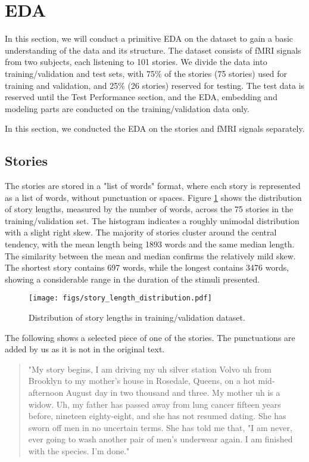 \documentclass[10pt,letterpaper]{article}
\begin{document}
\section{EDA}
In this section, we will conduct a primitive EDA on the dataset to gain a basic understanding of the data and its structure. The dataset consists of fMRI signals from two subjects, each listening to 101 stories. We divide the data into training/validation and test sets, with 75\% of the stories (75 stories) used for training and validation, and 25\% (26 stories) reserved for testing. The test data is reserved until the Test Performance section, and the EDA, embedding and modeling parts are conducted on the training/validation data only. 

In this section, we conducted the EDA on the stories and fMRI signals separately.

\subsection{Stories}
The stories are stored in a "list of words" format, where each story is represented as a list of words, without punctuation or spaces. Figure \ref{fig:story_length} shows the distribution of story lengths, measured by the number of words, across the 75 stories in the training/validation set. The histogram indicates a roughly unimodal distribution with a slight right skew. The majority of stories cluster around the central tendency, with the mean length being 1893 words and the same median length. The similarity between the mean and median confirms the relatively mild skew. The shortest story contains 697 words, while the longest contains 3476 words, showing a considerable range in the duration of the stimuli presented.

\begin{figure}[ht]
    \centering
    \texttt{[image: figs/story\_length\_distribution.pdf]}
    \caption{Distribution of story lengths in training/validation dataset.}
    \label{fig:story_length}
\end{figure}

The following shows a selected piece of one of the stories. The punctuations are added by us as it is not in the original text.

\begin{quotation}
    "My story begins, I am driving my uh silver station Volvo uh from Brooklyn to my mother's house in Rosedale, Queens, on a hot mid-afternoon August day in two thousand and three. My mother uh is a widow. Uh, my father has passed away from lung cancer fifteen years before, nineteen eighty-eight, and she has not resumed dating. She has sworn off men in no uncertain terms. She has told me that, "I am never, ever going to wash another pair of men's underwear again. I am finished with the species. I'm done."
\end{quotation}
\end{document}
